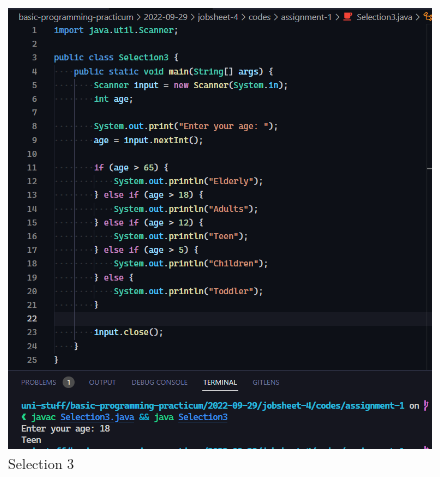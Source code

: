 \documentclass[12pt,titlepage]{article}
\begin{document}
\begin{enumerate}
{        \begin{figure}[h]
            \centering
            \includegraphics[width=.8\textwidth]{./images/selection-3.png}
            \caption{Selection 3}
        \end{figure}
    }
\end{enumerate}
\end{document}
